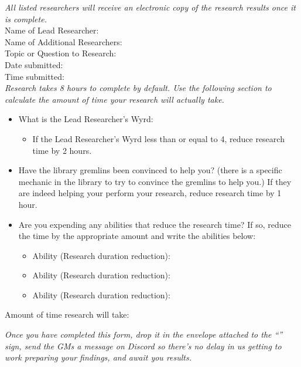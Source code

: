 \documentclass[green]{gl2018}
\begin{document}
\name{\gResearchForm{}}

\emph{All listed researchers will receive an electronic copy of the research results once it is complete.}\\
Name of Lead Researcher:\\
Name of Additional Researchers:\\

Topic or Question to Research:\\
Date submitted:\\
Time submitted:\\

\emph{Research takes 8 hours to complete by default. Use the following section to calculate the amount of time your research will actually take.}
\begin{itemize}
\item What is the Lead Researcher's Wyrd:  
\begin{itemize} \item If the Lead Researcher's Wyrd less than or equal to 4, reduce research time by 2 hours. \end{itemize}
\item Have the library gremlins been convinced to help you? (there is a specific mechanic in the library to try to convince the gremlins to help you.) If they are indeed helping your perform your research, reduce research time by 1 hour.
\item Are you expending any abilities that reduce the research time? If so, reduce the time by the appropriate amount and write the abilities below:
\begin{itemize}
\item Ability (Research duration reduction):
\item Ability (Research duration reduction):
\item Ability (Research duration reduction):
\end{itemize}
\end{itemize}

Amount of time research will take:

\emph{Once you have completed this form, drop it in the envelope attached to the ``\sResearchSubmission{\MYname}'' sign, send the GMs a message on Discord so there's no delay in us getting to work preparing your findings, and await you results.}
\end{document}
